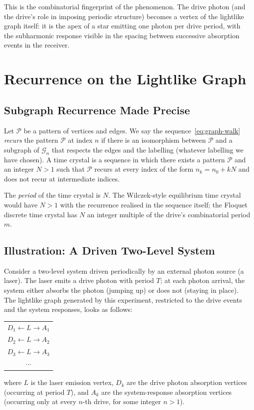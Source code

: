 \documentclass[11pt]{article}
\begin{document}
This is the combinatorial fingerprint of the phenomenon. The drive photon (and the drive's role in imposing periodic structure) becomes a vertex of the lightlike graph itself: it is the apex of a star emitting one photon per drive period, with the subharmonic response visible in the spacing between successive absorption events in the receiver.

\section{Recurrence on the Lightlike Graph}
\label{sec:recurrence}

\subsection{Subgraph Recurrence Made Precise}

Let $\mathcal{P}$ be a pattern of vertices and edges. We say the sequence~\eqref{eq:graph-walk} \emph{recurs} the pattern $\mathcal{P}$ at index $n$ if there is an isomorphism between $\mathcal{P}$ and a subgraph of $\mathcal{G}_n$ that respects the edges and the labelling (whatever labelling we have chosen). A time crystal is a sequence in which there exists a pattern $\mathcal{P}$ and an integer $N > 1$ such that $\mathcal{P}$ recurs at every index of the form $n_k = n_0 + kN$ and does not recur at intermediate indices.

The \emph{period} of the time crystal is $N$. The Wilczek-style equilibrium time crystal would have $N > 1$ with the recurrence realised in the sequence itself; the Floquet discrete time crystal has $N$ an integer multiple of the drive's combinatorial period $m$.

\subsection{Illustration: A Driven Two-Level System}

Consider a two-level system driven periodically by an external photon source (a laser). The laser emits a drive photon with period $T$; at each photon arrival, the system either absorbs the photon (jumping up) or does not (staying in place). The lightlike graph generated by this experiment, restricted to the drive events and the system responses, looks as follows:
\begin{center}
\begin{tabular}{c}
$D_1 \leftarrow L \rightarrow A_1$ \\
$D_2 \leftarrow L \rightarrow A_2$ \\
$D_3 \leftarrow L \rightarrow A_3$ \\
$\cdots$
\end{tabular}
\end{center}
where $L$ is the laser emission vertex, $D_k$ are the drive photon absorption vertices (occurring at period $T$), and $A_k$ are the system-response absorption vertices (occurring only at every $n$-th drive, for some integer $n > 1$).
\end{document}
